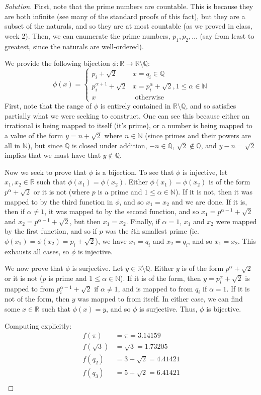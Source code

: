 \documentclass{article}
\newcommand{\N}{{\mathbb N}}
\newcommand{\Q}{{\mathbb Q}}
\newcommand{\R}{{\mathbb R}}
\begin{document}
\begin{proof}[Solution]\let\qed\relax
First, note that the prime numbers are countable.
This is because they are both infinite (see many of the standard proofs of this fact),
but they are a subset of the naturals,
and so they are at most countable (as we proved in class, week 2).
Then, we can enumerate the prime numbers, $p_1,p_2,\dots$
(say from least to greatest, since the naturals are well-ordered).

We provide the following bijection $\phi \colon \R \to \R\setminus\Q$:
\[\phi(x) = \begin{cases}
	p_i + \sqrt{2} & x = q_i \in \Q\\
	p_i^{\alpha + 1} + \sqrt{2} & x = p_i^{\alpha}+\sqrt{2}, 1 \leq \alpha \in \N\\
	x & \text{ otherwise}
\end{cases}
\]
First, note that the range of $\phi$ is entirely contained in $\R\setminus \Q$,
and so satisfies partially what we were seeking to construct.
One can see this because either an irrational is being mapped to itself
(it's prime),
or a number is being mapped to a value of the form $y = n + \sqrt{2}$
where $n\in\N$ (since primes and their powers are all in $\N$),
but since $\Q$ is closed under addition, $-n \in \Q$, $\sqrt{2}\not\in\Q$,
and $y - n = \sqrt{2}$ implies that we must have that $y \not\in \Q$.

Now we seek to prove that $\phi$ is a bijection.
To see that $\phi$ is injective,
let $x_1,x_2 \in \R$ such that $\phi(x_1) = \phi(x_2)$.
Either $\phi(x_1) = \phi(x_2)$ is of the form $p^\alpha + \sqrt{2}$ or it is not
(where $p$ is a prime and $1\leq\alpha\in\N$).
If it is not, then it was mapped to by the third function in $\phi$,
and so $x_1 = x_2$ and we are done.
If it is, then if $\alpha \neq 1$,
it was mapped to by the second function,
and so $x_1 = p^{\alpha-1}+\sqrt{2}$ and $x_2 = p^{\alpha-1}+\sqrt{2}$,
but then $x_1 = x_2$.
Finally, if $\alpha = 1$, $x_1$ and $x_2$ were mapped by the first function,
and so if $p$ was the $i$th smallest prime
(ie. $\phi(x_1) = \phi(x_2) = p_i + \sqrt{2}$), we have $x_1 = q_i$ and $x_2 = q_i$,
and so $x_1 = x_2$.
This exhausts all cases, so $\phi$ is injective.

We now prove that $\phi$ is surjective.
Let $y \in \R \setminus \Q$.
Either $y$ is of the form $p^{\alpha} + \sqrt{2}$ or it is not
($p$ is prime and $1 \leq \alpha \in \N$).
If it is of the form, then $y = p_i^{\alpha} + \sqrt{2}$ is mapped to from
$p_i^{\alpha-1} + \sqrt{2}$ if $\alpha \neq 1$,
and is mapped to from $q_i$ if $\alpha = 1$.
If it is not of the form, then $y$ was mapped to from itself.
In either case, we can find some $x \in \R$ such that $\phi(x) = y$,
and so $\phi$ is surjective.
Thus, $\phi$ is bijective.

Computing explicitly:
\begin{align*}
	f(\pi) &= \pi = 3.14159\\
	f(\sqrt{3}) &= \sqrt{3} = 1.73205\\
	f(q_2) &= 3 + \sqrt{2} = 4.41421\\
	f(q_3) &= 5 + \sqrt{2} = 6.41421\\
\end{align*}
\end{proof}
\end{document}
